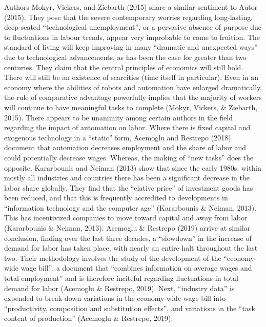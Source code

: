 \documentclass[12pt]{article}
\begin{document}
\begin{flushleft}
\break
\linebreak
Authors Mokyr, Vickers, and Ziebarth (2015) share a similar sentiment to Autor (2015). They pose that the severe contemporary worries regarding long-lasting, deep-seated ``technological unemployment”, or a pervasive absence of purpose due to fluctuations in labour trends, appear very improbable to come to fruition. The standard of living will keep improving in many ``dramatic and unexpected ways” due to technological advancements, as has been the case for greater than two centuries. They claim that the central principles of economics will still hold. There will still be an existence of scarcities (time itself in particular). Even in an economy where the abilities of robots and automation have enlarged dramatically, the rule of comparative advantage powerfully implies that the majority of workers will continue to have meaningful tasks to complete (Mokyr, Vickers, \& Ziebarth, 2015).
\break
\linebreak
There appears to be unanimity among certain authors in the field regarding the impact of automation on labor. Where there is fixed capital and exogenous technology in a ``static” form, Acemoglu and Restrepo (2018) document that automation decreases employment and the share of labor and could potentially decrease wages. Whereas, the making of ``new tasks” does the opposite. Kararbounis and Neiman (2013) show that since the early 1980s, within mostly all industries and countries there has been a significant decrease in the labor share globally. They find that the ``elative price” of investment goods has been reduced, and that this is frequently accredited to developments in ``information technology and the computer age” (Kararbounis \& Neiman, 2013). This has incentivized companies to move toward capital and away from labor (Kararbounis \& Neiman, 2013).
\break
\linebreak
Acemoglu \& Restrepo (2019) arrive at similar conclusion, finding over the last three decades, a ``slowdown” in the increase of demand for labor has taken place, with nearly an entire halt throughout the last two. Their methodology involves the study of the development of the ``economy-wide wage bill”, a document that ``combines information on average wages and total employment” and is therefore inciteful regarding fluctuations in total demand for labor (Acemoglu \& Restrepo, 2019). Next, ``industry data” is expended to break down variations in the economy-wide wage bill into “productivity, composition and substitution effects”, and variations in the “task content of production” (Acemoglu \& Restrepo, 2019).

\end{flushleft}
\end{document}
